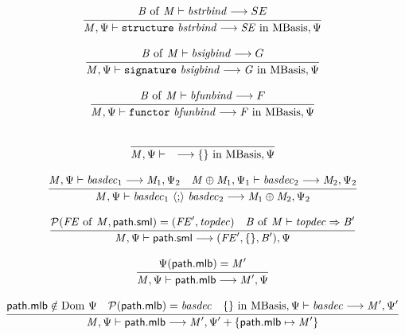 \begin{equation}
{\frac{\displaystyle\strut{
\mathit{B}~\mathrm{of}~\mathit{M} \vdash \mathit{bstrbind} \longrightarrow SE
}}{\displaystyle\strut{
\mathit{M}, \Psi  \vdash \mathtt{structure}~ \mathit{bstrbind}
\longrightarrow \mathit{SE} ~\mathrm{in}~ \mathrm{MBasis}, \Psi
}}}
\end{equation}

\begin{equation}
{\frac{\displaystyle\strut{
\mathit{B}~\mathrm{of}~\mathit{M} \vdash \mathit{bsigbind} \longrightarrow G
}}{\displaystyle\strut{
\mathit{M}, \Psi  \vdash \mathtt{signature}~ \mathit{bsigbind}
\longrightarrow \mathit{G } ~\mathrm{in}~ \mathrm{MBasis}, \Psi
}}}
\end{equation}

\begin{equation}
{\frac{\displaystyle\strut{
\mathit{B}~\mathrm{of}~\mathit{M} \vdash \mathit{bfunbind} \longrightarrow F
}}{\displaystyle\strut{
\mathit{M}, \Psi  \vdash \mathtt{functor}~ \mathit{bfunbind}
\longrightarrow \mathit{F} ~\mathrm{in}~ \mathrm{MBasis}, \Psi
}}}
\end{equation}

\begin{equation}
{\frac{\displaystyle\strut{
}}{\displaystyle\strut{
\mathit{M}, \Psi  \vdash \quad \longrightarrow \{\} ~\mathrm{in}~ \mathrm{MBasis}, \Psi
}}}
\end{equation}

\begin{equation}
{\frac{\displaystyle\strut{
\mathit{M}, \Psi  \vdash \mathit{basdec}_1 \longrightarrow \mathit{M}_1, \Psi_2 \quad
\mathit{M} \oplus \mathit{M}_1, \Psi_1  \vdash \mathit{basdec}_2 \longrightarrow \mathit{M}_2, \Psi_2 
}}{\displaystyle\strut{
\mathit{M}, \Psi  \vdash \mathit{basdec}_1 ~\langle\mathtt{;}\rangle~ \mathit{basdec}_2 \longrightarrow \mathit{M}_1 \oplus \mathit{M}_2, \Psi_2
}}}
\end{equation}

\begin{equation}
\label{eqn:mlb:SS:path.sml}
{\frac{\displaystyle\strut{
\mathcal{P}(\mathit{FE}~\mathrm{of}~\mathit{M}, \mathsf{path.sml}) = (\mathit{FE}', \mathit{topdec}) \quad
\mathit{B}~\mathrm{of}~\mathit{M} \vdash \mathit{topdec} \Rightarrow \mathit{B}'
}}{\displaystyle\strut{
\mathit{M}, \Psi  \vdash \mathsf{path.sml}  \longrightarrow (\mathit{FE}',\{\},\mathit{B}'), \Psi
}}}
\end{equation}

\begin{equation}
{\frac{\displaystyle\strut{
\Psi(\mathsf{path.mlb}) = \mathit{M}'
}}{\displaystyle\strut{
\mathit{M}, \Psi  \vdash \mathsf{path.mlb}  \longrightarrow \mathit{M}', \Psi
}}}
\end{equation}

\begin{equation}
{\frac{\displaystyle\strut{
\mathsf{path.mlb} \notin \mathrm{Dom}~\Psi \quad
\mathcal{P}(\mathsf{path.mlb}) = \mathit{basdec} \quad
\{\} ~\mathrm{in}~ \mathrm{MBasis}, \Psi  \vdash \mathit{basdec} \longrightarrow \mathit{M}', \Psi'
}}{\displaystyle\strut{
\mathit{M}, \Psi  \vdash \mathsf{path.mlb}  \longrightarrow \mathit{M}', \Psi' + \{\mathsf{path.mlb} \mapsto \mathit{M}'\} 
}}}
\end{equation}

